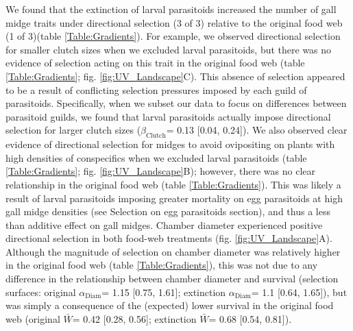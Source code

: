 \documentclass[11pt,]{article}
\begin{document}
\indent We found that the extinction of larval parasitoids increased the
number of gall midge traits under directional selection (3 of 3)
relative to the original food web (1 of 3)(table \ref{Table:Gradients}).
For example, we observed directional selection for smaller clutch sizes
when we excluded larval parasitoids, but there was no evidence of
selection acting on this trait in the original food web (table
\ref{Table:Gradients}; fig. \ref{fig:UV_Landscape}C). This absence of
selection appeared to be a result of conflicting selection pressures
imposed by each guild of parasitoids. Specifically, when we subset our
data to focus on differences between parasitoid guilds, we found that
larval parasitoids actually impose directional selection for larger
clutch sizes (\(\beta_{\text{Clutch}}\)= 0.13 {[}0.04, 0.24{]}). We also
observed clear evidence of directional selection for midges to avoid
ovipositing on plants with high densities of conspecifics when we
excluded larval parasitoids (table \ref{Table:Gradients}; fig.
\ref{fig:UV_Landscape}B); however, there was no clear relationship in
the original food web (table \ref{Table:Gradients}). This was likely a
result of larval parasitoids imposing greater mortality on egg
parasitoids at high gall midge densities (see Selection on egg
parasitoids section), and thus a less than additive effect on gall
midges. Chamber diameter experienced positive directional selection in
both food-web treatments (fig. \ref{fig:UV_Landscape}A). Although the
magnitude of selection on chamber diameter was relatively higher in the
original food web (table \ref{Table:Gradients}), this was not due to any
difference in the relationship between chamber diameter and survival
(selection surfaces: original \(\alpha_{\text{Diam}}\)= 1.15 {[}0.75,
1.61{]}; extinction \(\alpha_{\text{Diam}}\)= 1.1 {[}0.64, 1.65{]}), but
was simply a consequence of the (expected) lower survival in the
original food web (original \(\bar W\)= 0.42 {[}0.28, 0.56{]};
extinction \(\bar W\)= 0.68 {[}0.54, 0.81{]}).

\bigskip
\end{document}
